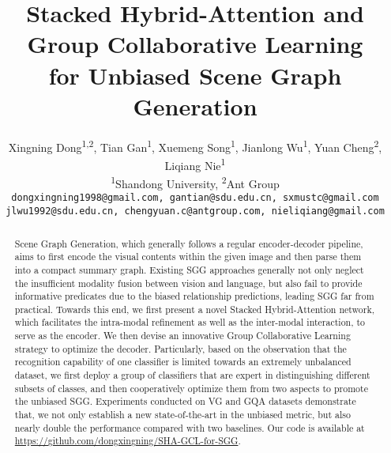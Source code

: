 \documentclass[10pt,twocolumn,letterpaper]{article}
\begin{document}
\title{Stacked Hybrid-Attention and Group Collaborative Learning\\
for Unbiased Scene Graph Generation}

\author{Xingning Dong\textsuperscript{\rm 1,\rm 2}, \quad Tian Gan\textsuperscript{\rm 1}{\footnotemark[2]}, \quad Xuemeng Song\textsuperscript{\rm 1}, \quad Jianlong Wu\textsuperscript{\rm 1}, \quad Yuan Cheng\textsuperscript{\rm 2}{\footnotemark[2]}, \quad Liqiang Nie\textsuperscript{\rm 1}\\[2pt]
\normalsize{\textsuperscript{\rm 1}Shandong University, \quad \quad \textsuperscript{\rm 2}Ant Group}\\
{\tt\small dongxingning1998@gmail.com, \quad gantian@sdu.edu.cn, \quad sxmustc@gmail.com} 
\\
{\tt\small jlwu1992@sdu.edu.cn, \quad chengyuan.c@antgroup.com, \quad nieliqiang@gmail.com}
}



\maketitle
\renewcommand{\thefootnote}{\fnsymbol{footnote}}



\begin{abstract}
Scene Graph Generation, which generally follows a regular encoder-decoder pipeline, aims to first encode the visual contents within the given image and then parse them into a compact summary graph. Existing SGG approaches generally not only neglect the insufficient modality fusion between vision and language, but also fail to provide informative predicates due to the biased relationship predictions, leading SGG far from practical. Towards this end, 
we first present a novel Stacked Hybrid-Attention network, which facilitates the intra-modal refinement as well as the inter-modal interaction, to serve as the encoder. We then devise an innovative Group Collaborative Learning strategy to optimize the decoder. Particularly, based on the observation that the recognition capability of one classifier is limited towards an extremely unbalanced dataset, we first deploy a group of classifiers that are expert in distinguishing different subsets of classes, and then cooperatively optimize them from two aspects to promote the unbiased SGG. Experiments conducted on VG and GQA datasets demonstrate that, we not only establish a new state-of-the-art in the unbiased metric, but also nearly double the performance compared with two baselines. Our code is available at \href{https://github.com/dongxingning/SHA-GCL-for-SGG}{https://github.com/dongxingning/SHA-GCL-for-SGG}.


\end{abstract}
\end{document}

